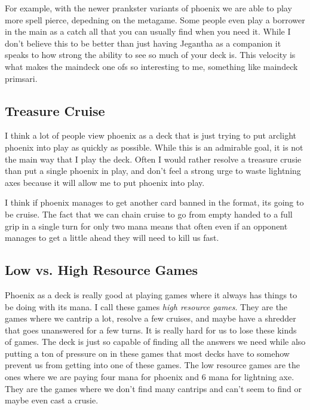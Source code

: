 \documentclass[12pt]{article}
\begin{document}
For example, with the newer prankster variants of phoenix we are able to play more spell pierce, depedning on the metagame. Some people even play a borrower in the main as a catch all that you can usually find when you need it. While I don't believe this to be better than just having Jegantha as a companion it speaks to how strong the ability to see so much of your deck is. This velocity is what makes the maindeck one ofs so interesting to me, something like maindeck primsari.

\subsection{Treasure Cruise}
I think a lot of people view phoenix as a deck that is just trying to put arclight phoenix into play as quickly as possible. While this is an admirable goal, it is not the main way that I play the deck. Often I would rather resolve a treasure crusie than put a single phoenix in play, and don't feel a strong urge to waste lightning axes because it will allow me to put phoenix into play.

I think if phoenix manages to get another card banned in the format, its going to be cruise. The fact that we can chain cruise to go from empty handed to a full grip in a single turn for only two mana means that often even if an opponent manages to get a little ahead they will need to kill us fast.

\subsection{Low vs. High Resource Games}
Phoenix as a deck is really good at playing games where it always has things to be doing with its mana. I call these games \emph{high resource games}. They are the games where we cantrip a lot, resolve a few cruises, and maybe have a shredder that goes unanswered for a few turns. It is really hard for us to lose these kinds of games. The deck is just so capable of finding all the answers we need while also putting a ton of pressure on in these games that most decks have to somehow prevent us from getting into one of these games. The low resource games are the ones where we are paying four mana for phoenix and 6 mana for lightning axe. They are the games where we don't find many cantrips and can't seem to find or maybe even cast a crusie.
\end{document}
